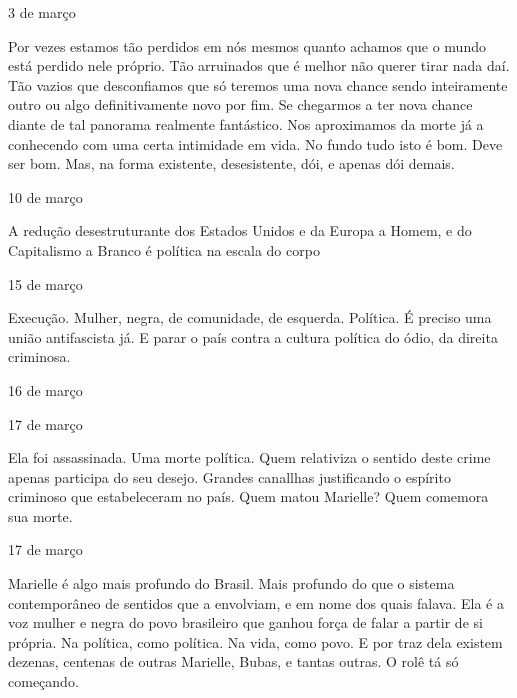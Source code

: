 \begin{flushright}
3 de março
\end{flushright}

Por vezes estamos tão perdidos em nós mesmos quanto achamos que o mundo
está perdido nele próprio. Tão arruinados que é melhor não querer tirar
nada daí. Tão vazios que desconfiamos que só teremos uma nova chance
sendo inteiramente outro ou algo definitivamente novo por fim. Se
chegarmos a ter nova chance diante de tal panorama realmente fantástico.
Nos aproximamos da morte já a conhecendo com uma certa intimidade em
vida. No fundo tudo isto é bom. Deve ser bom. Mas, na forma existente,
desesistente, dói, e apenas dói demais.

\begin{flushright}
10 de março
\end{flushright}

A redução desestruturante dos Estados Unidos e da Europa a Homem, e do
Capitalismo a Branco é política na escala do corpo

\begin{flushright}
15 de março
\end{flushright}

Execução. Mulher, negra, de comunidade, de esquerda. Política. É preciso
uma união antifascista já. E parar o país contra a cultura política do
ódio, da direita criminosa.

\begin{flushright}
16 de março
\end{flushright}

\begin{flushright}
17 de março
\end{flushright}

Ela foi assassinada. Uma morte política. Quem relativiza o sentido deste
crime apenas participa do seu desejo. Grandes canallhas justificando o
espírito criminoso que estabeleceram no país. Quem matou Marielle? Quem
comemora sua morte.

\begin{flushright}
17 de março
\end{flushright}

Marielle é algo mais profundo do Brasil. Mais profundo do que o sistema
contemporâneo de sentidos que a envolviam, e em nome dos quais falava.
Ela é a voz mulher e negra do povo brasileiro que ganhou força de falar
a partir de si própria. Na política, como política. Na vida, como povo.
E por traz dela existem dezenas, centenas de outras Marielle, Bubas, e
tantas outras. O rolê tá só começando.

